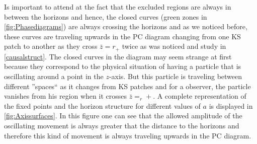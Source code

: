 Is important to attend at the fact that the excluded regions are always in between the horizons and hence, the closed curves (green zones in \cref{fig:Phasediagrams}) are always crossing the horizons and as we noticed before, these curves are traveling upwards in the \gls{PC} diagram changing from one \gls{KS} patch to another as they cross $\bar z=r_+$ twice as was noticed and study in \cref{causalstruct}. The closed curves in the diagram may seem strange at first because they correspond to the physical situation of having a particle that is oscillating around a point in the $z$-axis. But this particle is traveling between different ''spaces`` as it changes from \gls{KS} patches and for a observer, the particle vanishes from his region when it crosses $\bar z=_r+$. A complete representation of the fixed points and the horizon structure for different values of $a$ is displayed in \cref{fig:Axissurfaces}. In this figure one can see that the allowed amplitude of the oscillating movement is always greater that the distance to the horizons and therefore this kind of movement is always traveling upwards in the \gls{PC} diagram.
